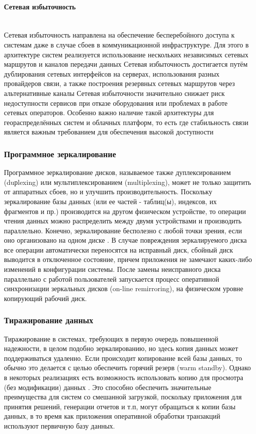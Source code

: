 \paragraph{Сетевая избыточность} ~\\
Сетевая избыточность направлена на обеспечение бесперебойного доступа к системам даже в случае сбоев в коммуникационной инфраструктуре. Для этого в архитектуре систем реализуется использование нескольких независимых сетевых маршрутов и каналов передачи данных \autocites{RajeshKumar}{heycoachHAA}
Сетевая избыточность достигается путём дублирования сетевых интерфейсов на серверах, использования разных провайдеров связи, а также построения резервных сетевых маршрутов через альтернативные каналы \autocite{OszuValduriez}
Сетевая избыточности значительно снижает риск недоступности сервисов при отказе оборудования или проблемах в работе сетевых операторов. Особенно важно наличие такой архитектуры для геораспределённых систем и облачных платформ, то есть где стабильность связи является важным требованием для обеспечения высокой доступности \autocite{Kleppmann}

\subsubsection{Программное зеркалирование} 

Программное зеркалирование дисков, называемое также дуплексированием (duрlexing) или мультиплексированием (multiplexing), может не только защитить от аппаратных сбоев, но и улучшить производительность. Поскольку зеркалирование базы данных (или ее частей - таблиц(ы), индексов, их фрагментов и пр.) производится на другом физическом устройстве, то операции чтения данных можно распределить между двумя устройствами и производить параллельно. Конечно, зеркалирование бесполезно с любой точки зрения, если оно организовано на одном диске \autocite{Baron}.
В случае повреждения зеркалируемого диска все операции автоматически переносятся на исправный диск, сбойный диск выводится в отключенное состояние, причем приложения не замечают каких-либо изменений в конфигурации системы.
После замены неисправного диска параллельно с работой пользователей запускается процесс оперативной синхронизации зеркальных дисков (on-line remirroring), на физическом уровне копирующий рабочий диск. \\

\subsubsection{Тиражирование данных}
Тиражирование в системах, требующих в первую очередь повышенной надежности, в целом подобно зеркалированию, но здесь копия данных может поддерживаться удаленно. Если происходит копирование всей базы данных, то обычно это делается с целью обеспечить горячий резерв (warm standby). Однако в некоторых реализациях есть возможность использовать копию для просмотра (без модификации) данных \autocite{Baron}. Это способно обеспечить значительные преимущества для систем со смешанной загрузкой, поскольку приложения для принятия решений, генерации отчетов и т.п, могут обращаться к копии базы данных, в то время как приложения оперативной обработки транзакций используют первичную базу данных.


